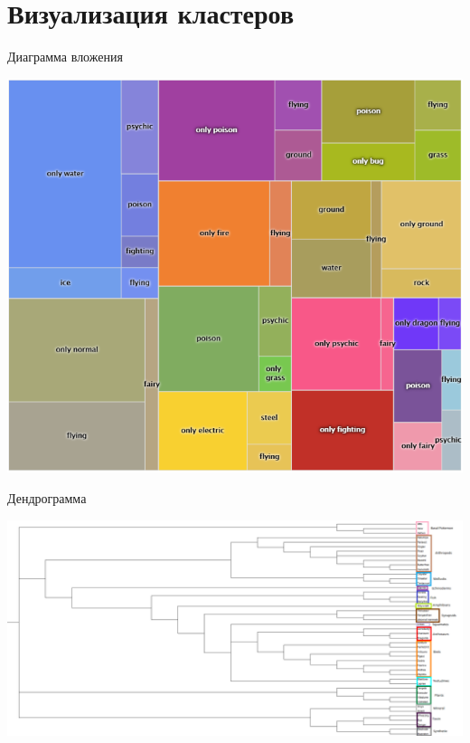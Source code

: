 \documentclass[10pt]{beamer}
\begin{document}
\section{Визуализация кластеров}

\begin{frame}{Диаграмма вложения}
  \begin{center}
    \includegraphics[height=0.8 \textheight, keepaspectratio = true]{images/diagram}    
  \end{center}
\end{frame}

\begin{frame}{Дендрограмма}
  \begin{center}
    \includegraphics[height=0.8 \textheight, width=0.8 \textwidth, keepaspectratio = true]{images/dendrogram}    
  \end{center}
\end{frame}
\end{document}
